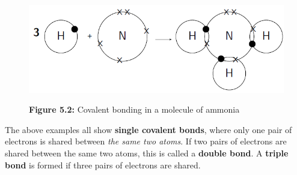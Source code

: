{\begin{mdframed}[linewidth=4, leftmargin=40, rightmargin=40]
\begin{exercise}
\begin{enumerate}[noitemsep, label=\textbf{Step} \textbf{\arabic*}. ]
    \setcounter{subfigure}{0}


	\begin{figure}[H] %
    \begin{center}
    \label{m38704*uid8!!!underscore!!!media}\label{m38704*uid8!!!underscore!!!printimage}\includegraphics{col11305.imgs/m38704_CG11C1_004.png} %
        
      \vspace{2pt}
    \vspace{\rubberspace}\par \begin{cnxcaption}
	  \small \textbf{Figure 5.2: }Covalent bonding in a molecule of ammonia
	\end{cnxcaption}
      
    \vspace{.1in}
    
    \end{center}

 \end{figure}   

    \addtocounter{footnote}{-0}
    
        
        \end{enumerate}
         

    \end{exercise}
    \end{mdframed}
    }
    \noindent
  
        \label{m38704*id139334}The above examples all show \textbf{single covalent bonds}, where only one pair of electrons is shared between \textsl{the same two atoms}. If two pairs of electrons are shared between the same two atoms, this is called a \textbf{double bond}. A \textbf{triple bond} is formed if three pairs of electrons are shared.\par 
\label{m38704*secfhsst!!!underscore!!!id142}\vspace{.5cm} 
      
